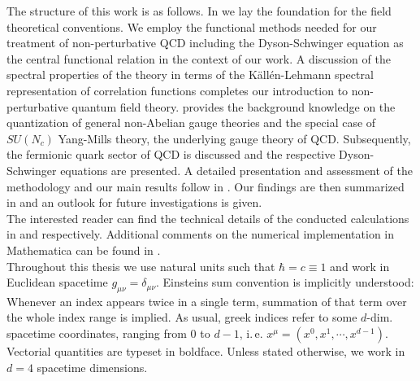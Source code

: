  The structure of this work is as follows. In   we lay the foundation for the field theoretical conventions. We employ the functional methods needed for our treatment of non-perturbative QCD including the Dyson-Schwinger equation as the central functional relation in the context of our work. A discussion of the spectral properties of the theory in terms of the K\"all\'{e}n-Lehmann spectral representation of correlation functions completes our introduction to non-perturbative quantum field theory.  provides the background knowledge on the quantization of general non-Abelian gauge theories and the special case of $SU(N_c)$ Yang-Mills theory, the underlying gauge theory of QCD. Subsequently, the fermionic quark sector of QCD is discussed and the respective Dyson-Schwinger equations are presented. A detailed presentation and assessment of the methodology and our main results follow in . Our findings are then summarized in  and an outlook for future investigations is given. \\
The interested reader can find the technical details of the conducted calculations in  and  respectively. Additional comments on the numerical implementation in Mathematica can be found in .\\
 Throughout this thesis we use natural units such that $\hbar = c  \equiv 1$ and work in Euclidean spacetime  $g_{\mu\nu}=\delta_{\mu\nu}$. Einsteins sum convention is implicitly understood: Whenever an index appears twice in a single term, summation of that term over the whole index range is implied. As usual, greek indices refer to some $d$-dim. spacetime coordinates, ranging from $0$ to $d-1$, i.\,e. $x^{\mu} = (x^0, x^1, \cdots, x^{d-1})$. Vectorial quantities are typeset in boldface. Unless stated otherwise, we work in $d=4$ spacetime dimensions.
